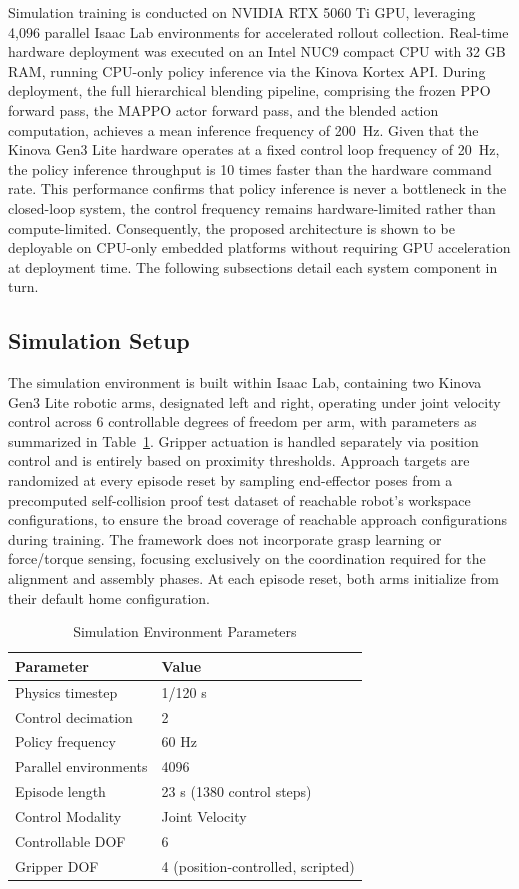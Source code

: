 \documentclass[a4paper,fleqn]{cas-dc}
\begin{document}
Simulation training is conducted on NVIDIA RTX 5060 Ti GPU, leveraging 4,096 parallel Isaac Lab environments for accelerated rollout collection. Real-time hardware deployment was executed on an Intel NUC9 compact CPU with 32 GB RAM, running CPU-only policy inference via the Kinova Kortex API. During deployment, the full hierarchical blending pipeline, comprising the frozen PPO forward pass, the MAPPO actor forward pass, and the blended action computation, achieves a mean inference frequency of 200~Hz. Given that the Kinova Gen3 Lite hardware operates at a fixed control loop frequency of 20~Hz, the policy inference throughput is 10 times faster than the hardware command rate. This performance confirms that policy inference is never a bottleneck in the closed-loop system, the control frequency remains hardware-limited rather than compute-limited. Consequently, the proposed architecture is shown to be deployable on CPU-only embedded platforms without requiring GPU acceleration at deployment time. The following subsections detail each system component in turn.

\subsection{Simulation Setup}
\label{simulation_setup}
The simulation environment is built within Isaac Lab, containing two Kinova Gen3 Lite robotic arms, designated left and right, operating under joint velocity control across 6 controllable degrees of freedom per arm, with parameters as summarized in Table~\ref{tab:hyperparams}. Gripper actuation is handled separately via position control and is entirely based on proximity thresholds. Approach targets are randomized at every episode reset by sampling end-effector poses from a precomputed self-collision proof test dataset of reachable robot's workspace configurations, to ensure the broad coverage of reachable approach configurations during training. The framework does not incorporate grasp learning or force/torque sensing, focusing exclusively on the coordination required for the alignment and assembly phases. At each episode reset, both arms initialize from their default home configuration.

\begin{table}[h]
\centering
\caption{Simulation Environment Parameters}
\begin{tabular}{ll}
\midrule 
\textbf{Parameter} & \textbf{Value} \\
\midrule \midrule
Physics timestep & 1/120 s \\
Control decimation & 2 \\
Policy frequency & 60 Hz \\
Parallel environments & 4096 \\
Episode length & 23 s (1380 control steps) \\
Control Modality & Joint Velocity \\
Controllable DOF & 6 \\
Gripper DOF & 4 (position-controlled, scripted) \\
\bottomrule
\end{tabular}
\label{tab:hyperparams}
\end{table}
\end{document}
